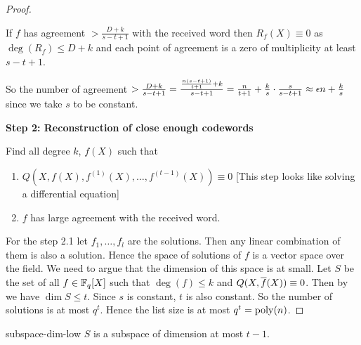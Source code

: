 \begin{proof}
\begin{observation}
    If $f$ has agreement $>\frac{D+k}{s-t+1}$ with the received word then $R_f(X)\equiv 0$ as $\deg(R_f)\leq D+k$ and each point of agreement is a zero of multiplicity at least $s-t+1$.
\end{observation}
So the number of agreement $>\frac{D+k}{s-t+1}=\frac{\frac{n(s-t+1)}{t+1}+k}{s-t+1}=\frac{n}{t+1}+\frac{k}{s}\cdot \frac{s}{s-t+1}\approx \epsilon n+\frac{k}{s}$ since we take $s$ to be constant. \parinf\vspace*{5mm}

\textbf{Step 2: Reconstruction of close enough codewords}\parinn

Find all degree $k$, $f(X)$ such that \begin{enumerate}[label=Step 2.\arabic*:, leftmargin=*]
    \item $Q(X,f(X), f^{(1)}(X),\dots, f^{(t-1)}(X))\equiv 0$ [This step looks like solving a differential equation]
    \item $f$ has large agreement with the received word.
\end{enumerate}
For the step 2.1 let $f_1,\dots, f_l$ are the solutions. Then any linear combination of them is also a solution. Hence the space of solutions of $f$ is a vector space over  the field. We need to argue that the dimension of this space is at small. Let $S$ be the set of all $f\in \mathbb{F}_q[X]$ such that $\deg(f)\leq k$ and $Q(X,\overline{f}(X))\equiv 0$. Then by  we have $\dim S\leq t$. Since $s$ is constant, $t$ is also constant. So the number of solutions is at most $q^t$. Hence the list size is at most $q^t=\operatorname{poly}(n)$. 
\end{proof}
\begin{lemma}{}{subspace-dim-low}
$S$ is a subspace of dimension at most $t-1$. 
\end{lemma}
